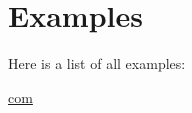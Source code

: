 \section{Examples}
Here is a list of all examples\-:\begin{DoxyCompactItemize}
\item 
\hyperlink{com-example}{com}
\end{DoxyCompactItemize}
